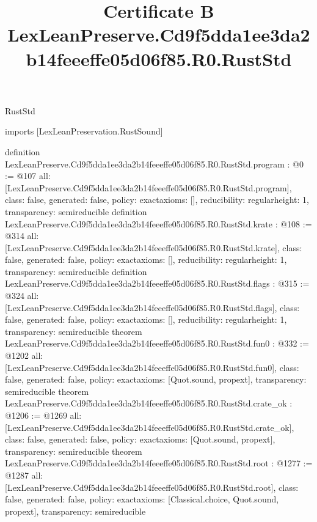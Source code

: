 \begin{lexlean}{RustStd}
\title{Certificate B LexLeanPreserve.Cd9f5dda1ee3da2b14feeeffe05d06f85.R0.RustStd}
\begin{coremodule}
imports [LexLeanPreservation.RustSound]

definition LexLeanPreserve.Cd9f5dda1ee3da2b14feeeffe05d06f85.R0.RustStd.program : @0 := @107 {
  all: [LexLeanPreserve.Cd9f5dda1ee3da2b14feeeffe05d06f85.R0.RustStd.program],
  class: false,
  generated: false,
  policy: exact{axioms: []},
  reducibility: regular{height: 1},
  transparency: semireducible
}
definition LexLeanPreserve.Cd9f5dda1ee3da2b14feeeffe05d06f85.R0.RustStd.krate : @108 := @314 {
  all: [LexLeanPreserve.Cd9f5dda1ee3da2b14feeeffe05d06f85.R0.RustStd.krate],
  class: false,
  generated: false,
  policy: exact{axioms: []},
  reducibility: regular{height: 1},
  transparency: semireducible
}
definition LexLeanPreserve.Cd9f5dda1ee3da2b14feeeffe05d06f85.R0.RustStd.flags : @315 := @324 {
  all: [LexLeanPreserve.Cd9f5dda1ee3da2b14feeeffe05d06f85.R0.RustStd.flags],
  class: false,
  generated: false,
  policy: exact{axioms: []},
  reducibility: regular{height: 1},
  transparency: semireducible
}
theorem LexLeanPreserve.Cd9f5dda1ee3da2b14feeeffe05d06f85.R0.RustStd.fun0 : @332 := @1202 {
  all: [LexLeanPreserve.Cd9f5dda1ee3da2b14feeeffe05d06f85.R0.RustStd.fun0],
  class: false,
  generated: false,
  policy: exact{axioms: [Quot.sound, propext]},
  transparency: semireducible
}
theorem LexLeanPreserve.Cd9f5dda1ee3da2b14feeeffe05d06f85.R0.RustStd.crate_ok : @1206 := @1269 {
  all: [LexLeanPreserve.Cd9f5dda1ee3da2b14feeeffe05d06f85.R0.RustStd.crate_ok],
  class: false,
  generated: false,
  policy: exact{axioms: [Quot.sound, propext]},
  transparency: semireducible
}
theorem LexLeanPreserve.Cd9f5dda1ee3da2b14feeeffe05d06f85.R0.RustStd.root : @1277 := @1287 {
  all: [LexLeanPreserve.Cd9f5dda1ee3da2b14feeeffe05d06f85.R0.RustStd.root],
  class: false,
  generated: false,
  policy: exact{axioms: [Classical.choice, Quot.sound, propext]},
  transparency: semireducible
}


\end{coremodule}
\end{lexlean}
